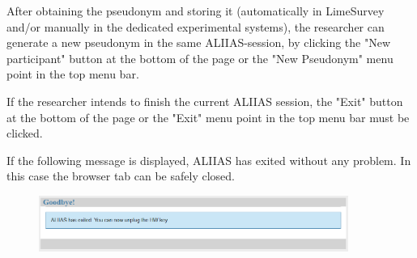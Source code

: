 After obtaining the pseudonym and storing it (automatically in LimeSurvey and/or manually in the dedicated experimental systems), the researcher can generate a new pseudonym in the same ALIIAS-session, by clicking the "New participant" button at the bottom of the page or the "New Pseudonym" menu point in the top menu bar.

If the researcher intends to finish the current ALIIAS session, the "Exit" button at the bottom of the page or the "Exit" menu point in the top menu bar must be clicked.

If the following message is displayed, ALIIAS has exited without any problem. In this case the browser tab can be safely closed.

\begin{figure}[H]
\includegraphics[width=0.9\textwidth]{docs/fig/08_exit.PNG}
\end{figure}

\small\setlength\fboxsep{5pt}\setlength\fboxrule{1pt}
